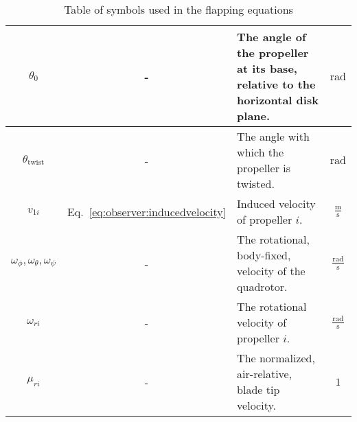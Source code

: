 \begin{table}
\begin{tabularx}{\tablewidth}{|c|c|X|c|}
            $\theta_{0}$ & - & The angle of the propeller at its base, relative to the horizontal disk plane. & $\text{rad}$ \\\hline
            $\theta_{\text{twist}}$ & - & The angle with which the propeller is twisted.  & $\text{rad}$ \\\hline
            $v_{1i}$ & Eq.~\eqref{eq:observer:inducedvelocity} & Induced velocity of propeller $i$. & $\frac{\text{m}}{\text{s}}$ \\\hline
            $\omega_{\phi},\omega_{\theta},\omega_{\psi}$ & - & The rotational, body-fixed, velocity of the quadrotor. & $\frac{\text{rad}}{\text{s}}$ \\\hline
            $\omega_{ri}$ & - & The rotational velocity of propeller $i$. & $\frac{\text{rad}}{\text{s}}$ \\\hline
            $\mu_{ri}$ & - & The normalized, air-relative, blade tip velocity. & $1$ \\\hline
        \end{tabularx}
        \label{tbl:observer:flapping:symbols}
        \caption{Table of symbols used in the flapping equations}
    \end{table}
